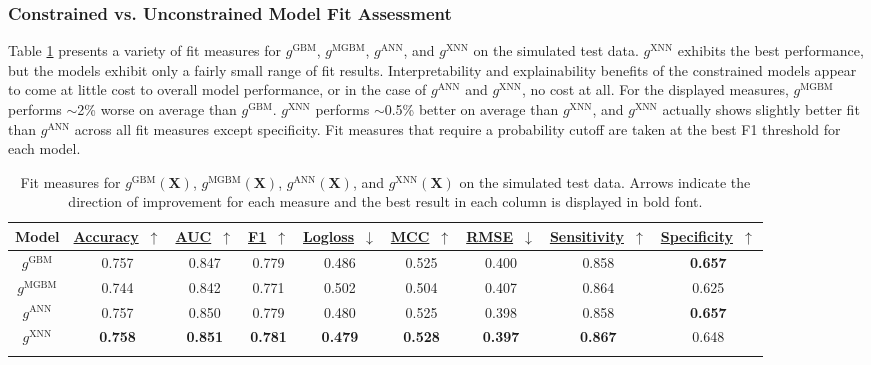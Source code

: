 \documentclass[information,article,submit,moreauthors,pdftex]{definitions/mdpi}
\begin{document}
\subsubsection{Constrained vs. Unconstrained Model Fit Assessment}\label{ssec:c_v_uc_sim}

Table \ref{tab:sim_acc} presents a variety of fit measures for $g^\text{GBM}$, $g^\text{MGBM}$, $g^\text{ANN}$, and $g^\text{XNN}$ on the simulated test data. $g^\text{XNN}$ exhibits the best performance, but the models exhibit only a fairly small range of fit results. Interpretability and explainability benefits of the constrained models appear to come at little cost to overall model performance, or in the case of $g^\text{ANN}$ and $g^\text{XNN}$, no cost at all. For the displayed measures, $g^\text{MGBM}$ performs $\sim$2\% worse on average than $g^\text{GBM}$. $g^\text{XNN}$ performs $\sim$0.5\% better on average than $g^\text{XNN}$, and $g^\text{XNN}$ actually shows slightly better fit than $g^\text{ANN}$ across all fit measures except specificity. Fit measures that require a probability cutoff are taken at the best F1 threshold for each model.

\begin{table}[H]
	\caption{Fit measures for $g^\text{GBM}(\mathbf{X})$, $g^\text{MGBM}(\mathbf{X})$, $g^\text{ANN}(\mathbf{X})$, and $g^\text{XNN}(\mathbf{X})$ on the simulated test data. Arrows indicate the direction of improvement for each measure and the best result in each column is displayed in bold font.}
	\centering
	\begin{tabular}{ccccccccc}
		\toprule
		\textbf{Model} & 
		\href{https://scikit-learn.org/stable/modules/model_evaluation.html#accuracy-score}{\textbf{Accuracy}}~$\uparrow$ & \href{https://en.wikipedia.org/wiki/Receiver_operating_characteristic#Area_under_the_curve}{\textbf{AUC}}~$\uparrow$ & \href{https://en.wikipedia.org/wiki/F1_score}{\textbf{F1}}~$\uparrow$ & 
		\href{https://scikit-learn.org/stable/modules/model_evaluation.html#log-loss}{\textbf{Logloss}}~$\downarrow$ & \href{https://en.wikipedia.org/wiki/Matthews_correlation_coefficient}{\textbf{MCC}}~$\uparrow$ & \href{https://en.wikipedia.org/wiki/Root-mean-square_deviation}{\textbf{RMSE}}~$\downarrow$ & \href{https://en.wikipedia.org/wiki/Sensitivity_and_specificity}{\textbf{Sensitivity}}~$\uparrow$ & \href{https://en.wikipedia.org/wiki/Sensitivity_and_specificity}{\textbf{Specificity}}~$\uparrow$ \\
		\midrule
		$g^\text{GBM}$		& 0.757 & 0.847 & 0.779 & 0.486 & 0.525 & 0.400 & 0.858 & \textbf{0.657} \\
		$g^\text{MGBM}$		& 0.744 & 0.842 & 0.771 & 0.502 & 0.504 & 0.407 & 0.864 & 0.625 \\
		$g^\text{ANN}$		& 0.757	& 0.850	& 0.779 & 0.480 & 0.525 & 0.398 & 0.858 & \textbf{0.657} \\
		$g^\text{XNN}$		& \textbf{0.758}	& \textbf{0.851}	& \textbf{0.781} & \textbf{0.479} & \textbf{0.528} & \textbf{0.397} & \textbf{0.867} & 0.648 \\
		\bottomrule
		\label{tab:sim_acc}
	\end{tabular}
\end{table}
\end{document}
